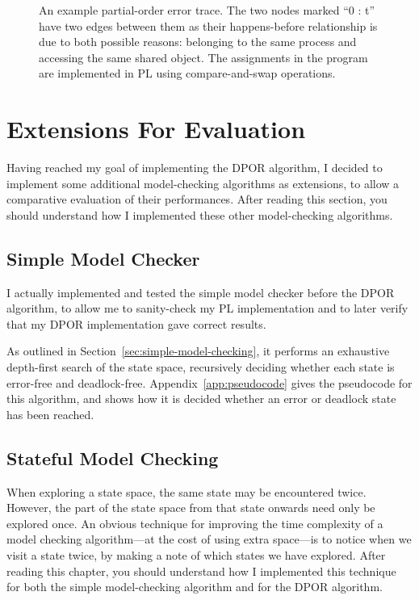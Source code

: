 \documentclass[12pt,a4paper,twoside,openright]{report}
\begin{document}
\begin{figure}
\begin{subfigure}{0.5\textwidth}
	\end{subfigure}
	\caption[An example partial-order
	error trace.]{An example partial-order
		error trace. The two nodes marked
		``0 : t'' have two edges between them
		as their happens-before relationship
		is due to both possible reasons:
		belonging to the
		same process and accessing the same
		shared object. The assignments in
		the program are implemented in PL
		using compare-and-swap operations.}
	\label{fig:trace-example}
\end{figure}

\section{Extensions For Evaluation}
Having reached my goal of implementing
the DPOR algorithm, I decided to
implement some additional model-checking
algorithms as extensions, to allow a
comparative evaluation of their
performances. After reading this
section, you should understand how
I implemented these other model-checking
algorithms.

\subsection{Simple Model Checker}
I actually implemented and tested
the simple
model checker before the DPOR
algorithm, to allow me to
sanity-check my PL implementation
and to later verify
that my DPOR implementation
gave correct results.

As outlined in
Section~\ref{sec:simple-model-checking}, it
performs an exhaustive depth-first
search of the state space,
recursively deciding whether each
state is error-free
and deadlock-free.
Appendix~\ref{app:pseudocode} gives
the pseudocode for this algorithm,
and shows how it is decided whether
an error or deadlock state has been reached.

\subsection{Stateful Model Checking}
When exploring a state space, the same state may be
encountered twice. However, the part of the state
space from that state onwards need only be explored
once. An obvious technique for improving the
time complexity of a model checking algorithm---at
the cost of using extra space---is to notice
when we visit a state twice, by making a note
of which states we have explored. After reading
this chapter, you should understand how I
implemented this technique for both the simple
model-checking algorithm and for the
DPOR algorithm.
\end{document}
